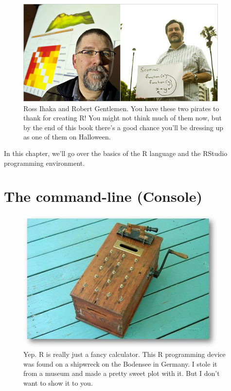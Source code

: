 \documentclass[]{book}
\theoremstyle{definition}
\theoremstyle{definition}
\theoremstyle{remark}
\begin{document}
\begin{figure}

{\centering \includegraphics[width=400px]{images/rauthors} 

}

\caption{Ross Ihaka and Robert Gentlemen. You have these two pirates to thank for creating R! You might not think much of them now, but by the end of this book there's a good chance you'll be dressing up as one of them on Halloween.}\label{fig:unnamed-chunk-35}
\end{figure}

In this chapter, we'll go over the basics of the R language and the
RStudio programming environment.

\section{The command-line (Console)}\label{the-command-line-console}

\begin{figure}

{\centering \includegraphics[width=400px]{images/woodcalc} 

}

\caption{Yep. R is really just a fancy calculator. This R programming device was found on a shipwreck on the Bodensee in Germany. I stole it from a museum and made a pretty sweet plot with it. But I don't want to show it to you.}\label{fig:unnamed-chunk-36}
\end{figure}
\end{document}
